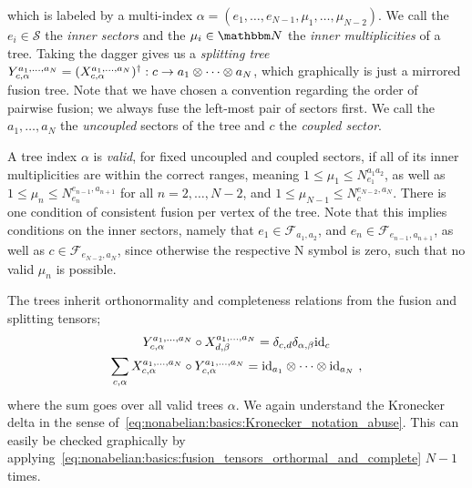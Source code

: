 which is labeled by a multi-index $\alpha = (e_1, \dots, e_{N-1}, \mu_1, \dots, \mu_{N-2})$.
%
We call the $e_i \in \mathcal{S}$ the \emph{inner sectors} and the $\mu_i \in \Nbb$ the \emph{inner multiplicities} of a tree.
%
Taking the dagger gives us a \emph{splitting tree} $Y^{a_1,\dots,a_N}_{c,\alpha} = (X^{a_1,\dots,a_N}_{c,\alpha})^\dagger : c \to a_1\otimes\dots\otimes a_N$, which graphically is just a mirrored fusion tree.
%
Note that we have chosen a convention regarding the order of pairwise fusion; we always fuse the left-most pair of sectors first.
%
We call the $a_1, \dots, a_N$ the \emph{uncoupled} sectors of the tree and $c$ the \emph{coupled sector}.

A tree index $\alpha$ is \emph{valid}, for fixed uncoupled and coupled sectors, if all of its inner multiplicities are within the correct ranges, meaning $1 \leq \mu_1 \leq N^{a_1a_2}_{e_1}$, as well as $1 \leq \mu_n \leq N^{e_{n-1},a_{n+1}}_{e_n}$ for all $n = 2, \dots, N - 2$, and $1 \leq \mu_{N-1} \leq N^{e_{N-2},a_N}_c$.
%
There is one condition of consistent fusion per vertex of the tree.
%
Note that this implies conditions on the inner sectors, namely that $e_1 \in \mathcal{F}_{a_1,a_2}$, and $e_n \in \mathcal{F}_{e_{n-1},a_{n+1}}$, as well as $c \in \mathcal{F}_{e_{N-2}, a_N}$, since otherwise the respective N symbol is zero, such that no valid $\mu_n$ is possible.

The trees inherit orthonormality and completeness relations from the fusion and splitting tensors;
\begin{gather}
    \label{eq:nonabelian:basics:fusion_trees_orthonormal}
    Y^{a_1,\dots,a_N}_{c,\alpha} \circ X^{a_1,\dots,a_N}_{d,\beta}
    = \delta_{c,d} \delta_{\alpha,\beta} \mathrm{id}_{c}
    \\
    \label{eq:nonabelian:basics:fusion_trees_complete}
    \sum_{c,\alpha} X^{a_1,\dots,a_N}_{c,\alpha} \circ Y^{a_1,\dots,a_N}_{c,\alpha} = \mathrm{id}_{a_1} \otimes \dots \otimes \mathrm{id}_{a_N}
    ~,
\end{gather}
where the sum goes over all valid trees $\alpha$.
%
We again understand the Kronecker delta in the sense of~\eqref{eq:nonabelian:basics:Kronecker_notation_abuse}.
%
This can easily be checked graphically by applying~\eqref{eq:nonabelian:basics:fusion_tensors_orthormal_and_complete} $N-1$ times.


